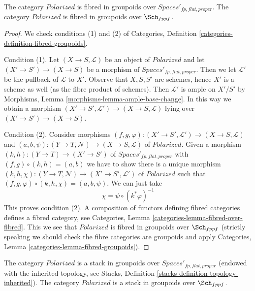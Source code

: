 \begin{lemma}
\label{lemma-polarized-fibred-in-groupoids}
The category $\textit{Polarized}$ is fibred in groupoids over
$\textit{Spaces}'_{fp, flat, proper}$.
The category $\textit{Polarized}$ is fibred in groupoids over $\Sch_{fppf}$.
\end{lemma}

\begin{proof}
We check conditions (1) and (2) of
Categories, Definition \ref{categories-definition-fibred-groupoids}.

\medskip\noindent
Condition (1). Let $(X \to S, \mathcal{L})$ be an object of
$\textit{Polarized}$ and let $(X' \to S') \to (X \to S)$
be a morphism of $\textit{Spaces}'_{fp, flat, proper}$. Then we
let $\mathcal{L}'$ be the pullback of $\mathcal{L}$ to $X'$.
Observe that $X, S, S'$ are schemes, hence $X'$ is a scheme
as well (as the fibre product of schemes). Then
$\mathcal{L}'$ is ample on $X'/S'$ by
Morphisms, Lemma \ref{morphisms-lemma-ample-base-change}.
In this way we obtain a morphism
$(X' \to S', \mathcal{L}') \to (X \to S, \mathcal{L})$
lying over $(X' \to S') \to (X \to S)$.

\medskip\noindent
Condition (2). Consider morphisms
$(f, g, \varphi) : (X' \to S', \mathcal{L}') \to (X \to S, \mathcal{L})$ and
$(a, b, \psi) : (Y \to T, \mathcal{N}) \to (X \to S, \mathcal{L})$
of $\textit{Polarized}$. Given a morphism $(k, h) : (Y \to T) \to (X' \to S')$
of $\textit{Spaces}'_{fp, flat, proper}$
with $(f, g) \circ (k, h) = (a, b)$ we have to show
there is a unique morphism
$(k, h, \chi) : (Y \to T, \mathcal{N}) \to (X' \to S', \mathcal{L}')$
of $\textit{Polarized}$ such that
$(f, g, \varphi) \circ (k, h, \chi) = (a, b, \psi)$.
We can just take
$$
\chi = \psi \circ (k^*\varphi)^{-1}
$$
This proves condition (2). A composition of functors defining
fibred categories defines a fibred category, see
Categories, Lemma \ref{categories-lemma-fibred-over-fibred}.
This we see that $\textit{Polarized}$ is fibred in groupoids over
$\Sch_{fppf}$ (strictly speaking we should check the fibre
categories are groupoids and apply
Categories, Lemma \ref{categories-lemma-fibred-groupoids}).
\end{proof}

\begin{lemma}
\label{lemma-polarized-stack}
The category $\textit{Polarized}$ is a stack in groupoids over
$\textit{Spaces}'_{fp, flat, proper}$ (endowed with the inherited topology,
see Stacks, Definition \ref{stacks-definition-topology-inherited}).
The category $\textit{Polarized}$ is a stack in groupoids over $\Sch_{fppf}$.
\end{lemma}

